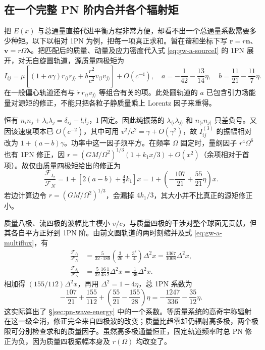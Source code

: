 \subsection{在一个完整 PN 阶内合并各个辐射矩}

把 $E(x)$ 与总通量直接代进平衡方程非常方便，却看不出一个总通量系数需要多少种矩。以下以相对 1PN 为例，把每一项真正求和。暂在谐和坐标下写 $\bm r=r\bm n$、$\bm v=r\Omega\bm\lambda$。把匹配后的质量、动量及应力密度代入式 \eqref{eq:gw-a-sourceI} 的 1PN 展开，对无自旋圆轨道，源质量四极矩为
\[
 I_{ij}=\mu\left[(1+a\gamma)r_{\langle i}r_{j\rangle}
                 +b\frac{r^2}{c^2}v_{\langle i}v_{j\rangle}\right]+O(c^{-4}),
 \quad a=-\frac1{42}-\frac{13}{14}\eta,\quad
 b=\frac{11}{21}-\frac{11}{7}\eta .
\]
在一般偏心轨道还有与 $\dot r\,r_{\langle i}v_{j\rangle}$ 等组合有关的项。此处圆轨道的 $a$ 已包含引力场能量对源矩的修正，不能只把各粒子静质量乘上 Lorentz 因子来重得。

恒有 $n_i n_j+\lambda_i\lambda_j=\delta_{ij}-l_il_j$，$\bm l$ 固定。因此纯振荡的 $\lambda_{\langle i}\lambda_{j\rangle}$ 和 $n_{\langle i}n_{j\rangle}$ 只差负号。又因该速度项本已 $O(c^{-2})$，其中可用 $v^2/c^2=\gamma+O(\gamma^2)$，故 $I_{ij}^{(3)}$ 的振幅相对改为 $1+(a-b)\gamma$。功率中这一因子须平方。在频率 $\Omega$ 固定时，量纲因子 $r^4\Omega^6$ 也有 1PN 修正，因 $r=(GM/\Omega^2)^{1/3}(1+k_1x/3)+O(x^2)$（余项相对于首项）。故仅由质量四极矩给出的修正为
\[
 \frac{\mathcal F_{I_2}}{\mathcal F_N}
 =1+\left[2(a-b)+\tfrac43 k_1\right]x
 =1+\left(-\frac{107}{21}+\frac{55}{21}\eta\right)x .
\]
若边计算边令 $r=(GM/\Omega^2)^{1/3}$，会漏掉 $4k_1/3$，其大小并不比真正的源矩修正小。

质量八极、流四极的波幅比主模小 $v/c$，与质量四极的干涉对整个球面无贡献，但其各自平方正好到 1PN 阶。由前文圆轨道的两时刻缩并及式 \eqref{eq:gw-a-multiflux}，有
\begin{align*}
 \frac{\mathcal F_{I_3}}{\mathcal F_N}
 &=\frac{5}{32\cdot189}\left(\frac{3}{20}+\frac{3^8}{4}\right)
      \Delta^2 x=\frac{1367}{1008}\Delta^2 x,\\
 \frac{\mathcal F_{J_2}}{\mathcal F_N}
 &=\frac{5}{32}\frac{16}{45}\frac12\Delta^2 x
   =\frac1{36}\Delta^2 x .
\end{align*}
相加得 $(155/112)\Delta^2 x$，再用 $\Delta^2=1-4\eta$，总 1PN 系数为
\[
 -\frac{107}{21}+\frac{155}{112}
       +\left(\frac{55}{21}-\frac{155}{28}\right)\eta
       =-\frac{1247}{336}-\frac{35}{12}\eta .
\]
这实际算出了 \S\ref{sec:pn-wave-energy} 中的一个系数。等质量系统的高奇宇称辐射在这一级全消，修正完全来自四极波的改变；质量比趋零却仍辐射高多极，两个极限可分别检查求和的质量因子。虽然高多极通量恒正，固定轨道频率时总 PN 修正为负，因为质量四极振幅本身及 $r(\Omega)$ 均改变了。

